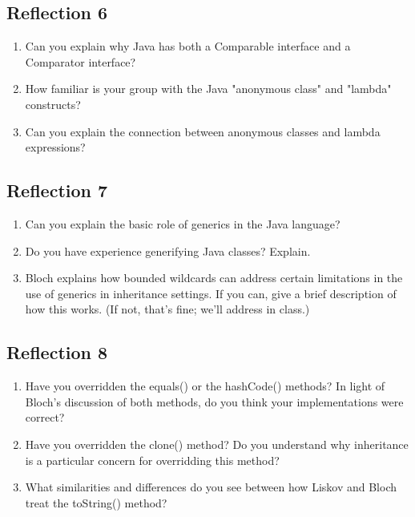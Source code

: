 \documentclass[11pt]{article}
\begin{document}
\subsection{Reflection 6}
\label{sec:org9e30842}

\begin{enumerate}
\item Can you explain why Java has both a Comparable interface and a Comparator interface?
\item How familiar is your group with the Java "anonymous class" and "lambda" constructs?
\item Can you explain the connection between anonymous classes and lambda expressions?
\end{enumerate}



\subsection{Reflection 7}
\label{sec:org9010b55}


\begin{enumerate}
\item Can you explain the basic role of generics in the Java language?
\item Do you have experience generifying Java classes? Explain.
\item Bloch explains how bounded wildcards can address certain limitations in the use of generics in inheritance settings. If you can, give a brief description of how this works. (If not, that's fine; we'll address in class.)
\end{enumerate}


\subsection{Reflection 8}
\label{sec:org5e72093}


\begin{enumerate}
\item Have you overridden the equals() or the hashCode() methods? In light of Bloch's discussion of both methods, do you think your implementations were correct?
\item Have you overridden the clone() method? Do you understand why inheritance is a particular concern for overridding this method?
\item What similarities and differences do you see between how Liskov and Bloch treat the toString() method?
\end{enumerate}
\end{document}
